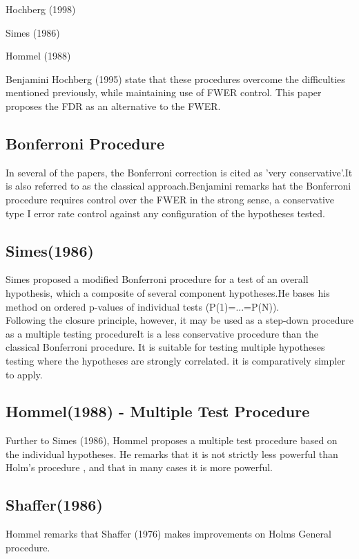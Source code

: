 \documentclass{article}
\begin{document}
 \begin{list}{}
 \item Hochberg (1998)
 \item Simes (1986)
 \item Hommel (1988)
 \end{list}

Benjamini Hochberg (1995) state that these procedures overcome the
difficulties mentioned previously, while maintaining use of FWER
control. This paper proposes the FDR as an alternative to the
FWER.

\subsection*{Bonferroni Procedure }
In several of the papers, the Bonferroni correction is cited as
'very conservative'.It is also referred to as the classical
approach.Benjamini remarks  hat the Bonferroni procedure requires
control over the FWER in the strong sense, a conservative type I
error rate control against any configuration of the hypotheses
tested.


\subsection*{Simes(1986) }
Simes proposed a modified Bonferroni procedure for a test of an
overall hypothesis, which a composite of several component
hypotheses.He bases his method on ordered p-values of individual
tests (P(1)=...=P(N)). \\Following the closure principle, however,
it may be used as a step-down procedure as a multiple testing
procedureIt is a less conservative procedure than the classical
Bonferroni procedure. It is suitable for testing multiple
hypotheses testing where the hypotheses are strongly correlated.
it is comparatively simpler to apply.

\subsection*{Hommel(1988) - Multiple Test Procedure}
Further to Simes (1986), Hommel proposes a multiple test procedure
based on the individual hypotheses. He remarks that it is not
strictly less powerful than Holm's procedure , and that in many
cases it is more powerful.

\subsection*{Shaffer(1986)}
Hommel remarks that Shaffer (1976) makes improvements on Holms
General procedure.
\end{document}
